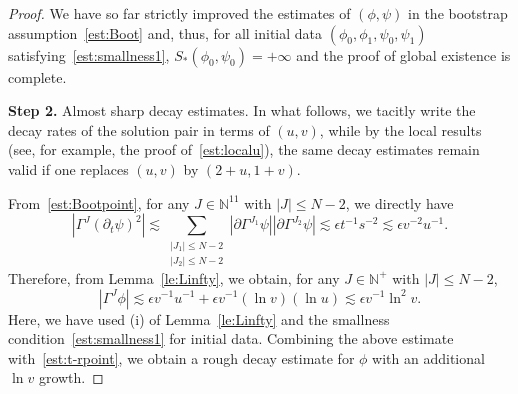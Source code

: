 \documentclass[a4paper,reqno]{amsart}
\theoremstyle{definition}
\numberwithin{equation}{section}
\def \pt{\partial_{t}}
\begin{document}
\begin{proof}
\smallskip
We have so far strictly improved the estimates of $(\phi,\psi)$ in the bootstrap assumption~\eqref{est:Boot} and, thus, for all initial data $(\phi_{0},\phi_1, {\psi}_{0},\psi_1)$ satisfying~\eqref{est:smallness1}, {$S_{*}(\phi_{0},\psi_{0})=+\infty$ and} the proof of global existence is complete.

\smallskip
\textbf{Step 2.} Almost sharp decay estimates.
In what follows, we tacitly write the decay rates of the solution pair in terms of $(u,v)$,
while by the local results (see, for example, the proof of~\eqref{est:localu}), the same decay estimates remain valid if one replaces $(u,v)$ by $(2+u,1+v)$.

\smallskip
From~\eqref{est:Bootpoint}, for any $J\in \mathbb{N}^{11}$ with $|J|\le N-2$, we directly have 
\begin{equation*}
    \left|\Gamma^{J}(\pt \psi )^{2}\right|
    \lesssim \sum_{\substack{|J_{1}|\le N-2\\ |J_{2}|\le N-2}}
    \left|\partial \Gamma^{J_{1}}\psi\right|
    \left|\partial \Gamma^{J_{2}}\psi\right|\lesssim \epsilon t^{-1}s^{-2}\lesssim \epsilon v^{-2}u^{-1}.
\end{equation*}
Therefore, from Lemma~\ref{le:Linfty},  we obtain,   for any $J\in \mathbb{N}^{+}$ with $|J|\le N-2$,
\begin{equation*}
    \left| \Gamma^{J}\phi\right|\lesssim 
    \epsilon v^{-1}u^{-1}+\epsilon v^{-1}(\ln v) (\ln u)\lesssim \epsilon v^{-1}\ln^{2}v.
\end{equation*}
Here, we have used (i) of Lemma~\ref{le:Linfty} and the smallness condition~\eqref{est:smallness1} for initial data.
Combining the above estimate with~\eqref{est:t-rpoint}, we obtain a rough decay estimate for $\phi$ with an additional $\ln v$ growth.


\end{proof}
\end{document}
